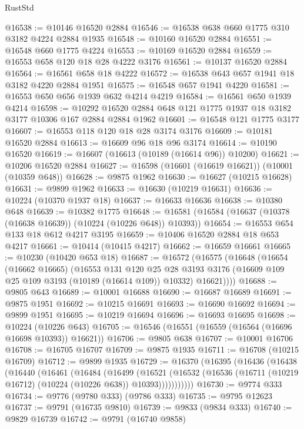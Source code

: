 \begin{lexlean}{RustStd}
\begin{coremodule}
@16538 := @10146 @16520 @2884
@16546 := @16538 @638 @660 @1775 @310 @3182 @4224 @2884 @1935
@16548 := @10160 @16520 @2884
@16551 := @16548 @660 @1775 @4224
@16553 := @10169 @16520 @2884
@16559 := @16553 @658 @120 @18 @28 @4222 @3176
@16561 := @10137 @16520 @2884
@16564 := @16561 @658 @18 @4222
@16572 := @16538 @643 @657 @1941 @18 @3182 @4220 @2884 @1951
@16575 := @16548 @657 @1941 @4220
@16581 := @16553 @650 @656 @1939 @632 @4214 @4219
@16584 := @16561 @650 @1939 @4214
@16598 := @10292 @16520 @2884 @648 @121 @1775 @1937 @18 @3182 @3177 @10306 @167 @2884 @2884 @1962
@16601 := @16548 @121 @1775 @3177
@16607 := @16553 @118 @120 @18 @28 @3174 @3176
@16609 := @10181 @16520 @2884
@16613 := @16609 @96 @18 @96 @3174
@16614 := @10190 @16520
@16619 := @16607 (@16613 (@10189 (@16614 @96)) @10200)
@16621 := @10206 @16520 @2884
@16627 := @16598 (@16601 (@16619 @16621)) (@10001 (@10359 @648))
@16628 := @9875 @1962
@16630 := @16627 (@10215 @16628)
@16631 := @9899 @1962
@16633 := @16630 (@10219 @16631)
@16636 := @10224 (@10370 @1937 @18)
@16637 := @16633 @16636
@16638 := @10380 @648
@16639 := @10382 @1775
@16648 := @16581 (@16584 (@16637 (@10378 (@16638 @16639)) (@10224 (@10226 @648)) @10393))
@16654 := @16553 @654 @133 @18 @612 @4217 @3195
@16659 := @10406 @16520 @2884 @18 @653 @4217
@16661 := @10414 (@10415 @4217)
@16662 := @16659 @16661
@16665 := @10230 (@10420 @653 @18)
@16687 := @16572
    (@16575
      (@16648
        (@16654
          (@16662 @16665)
          (@16553
            @131
            @120
            @25
            @28
            @3193
            @3176
            (@16609 @109 @25 @109 @3193 (@10189 (@16614 @109)) @10332)
            @16621))))
@16688 := @9805 @643
@16689 := @10001 @16688
@16690 := @16687 @16689
@16691 := @9875 @1951
@16692 := @10215 @16691
@16693 := @16690 @16692
@16694 := @9899 @1951
@16695 := @10219 @16694
@16696 := @16693 @16695
@16698 := @10224 (@10226 @643)
@16705 := @16546 (@16551 (@16559 (@16564 (@16696 @16698 @10393)) @16621))
@16706 := @9805 @638
@16707 := @10001 @16706
@16708 := @16705 @16707
@16709 := @9875 @1935
@16711 := @16708 (@10215 @16709)
@16712 := @9899 @1935
@16729 := @16370
    (@16395
      (@16436
        (@16438
          (@16440
            (@16461
              (@16484
                (@16499
                  (@16521
                    (@16532 (@16536 (@16711 (@10219 @16712) (@10224 (@10226 @638)) @10393)))))))))))
@16730 := @9774 @333
@16734 := @9776 (@9780 @333) (@9786 @333)
@16735 := @9795 @12623
@16737 := @9791 (@16735 @9810)
@16739 := @9833 (@9834 @333)
@16740 := @9829 @16739
@16742 := @9791 (@16740 @9858)

\end{coremodule}
\end{lexlean}
